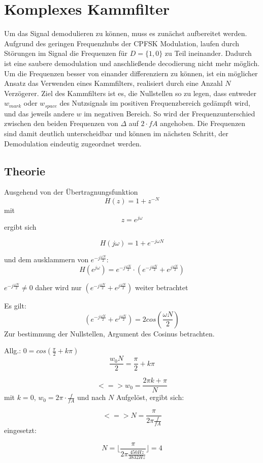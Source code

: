 \documentclass{article}
\begin{document}
\section{Komplexes Kammfilter}\label{sec:comb}
Um das Signal demodulieren zu können, muss es zunächst aufbereitet werden. 
Aufgrund des geringen Frequenzhubs der CPFSK Modulation, laufen durch Störungen im Signal die Frequenzen 
für $D = \{1, 0\}$ zu Teil ineinander. Dadurch ist eine saubere demodulation und anschließende decodierung
nicht mehr möglich. Um die Frequenzen besser von einander differenziern zu können, ist ein möglicher Ansatz 
das Verwenden eines Kammfilters, realisiert durch eine Anzahl $N$ Verzögerer.
Ziel des Kammfilters ist es, die Nullstellen so zu legen, dass entweder $w_{mark}$ oder $w_{space}$ des Nutzsignals im positiven Frequenzbereich
gedämpft wird, und das jeweils andere $w$ im negativen Bereich. So wird der Frequenzunterschied zwischen den beiden Frequenzen von $\varDelta$ auf $2\cdot fA$ angehoben.
Die Frequenzen sind damit deutlich unterscheidbar und können im nächsten Schritt, der Demodulation eindeutig zugeordnet werden. 

\subsection{Theorie}


Ausgehend von der Übertragnungsfunktion 
$$H(z) = 1 + z^{-N}$$ 
mit 
$$ z = e^{j\omega} $$
ergibt sich

$$H(j\omega) = 1 + e^{-j\omega N}$$

und dem ausklammern von $ e^{-j \frac{\omega N}{2}}$:
$$
H(e^{j\omega}) = e^{-j \frac{\omega N}{2}} \cdot (e^{-j \frac{\omega N}{2}} + e^{j \frac{\omega N}{2}})
$$

$e^{-j \frac{\omega N}{2}} \neq 0$ daher wird nur $(e^{-j \frac{\omega N}{2}} + e^{j \frac{\omega N}{2}})$ weiter betrachtet

Es gilt:
$$
(e^{-j \frac{\omega N}{2}} + e^{j \frac{\omega N}{2}}) = 2  cos(\frac{\omega N}{2})
$$
Zur bestimmung der Nullstellen, Argument des Cosinus betrachten.

Allg.: $0 = cos(\frac{\pi}{2} + k\pi)$
$$
\frac{w_0 N}{2} = \frac{\pi}{2} + k\pi
$$

$$
<=> w_0 = \frac{2\pi k + \pi}{N}
$$
mit $k = 0$, $w_0 = 2\pi \cdot \frac{f}{fA}$ und nach $N$ Aufgelöst, ergibt sich:

$$
<=> N = \frac{\pi}{2\pi \frac{f}{fA}}
$$
eingesetzt:

$$
N = \lfloor \frac{\pi}{2\pi \frac{450Hz}{3832Hz}}\rfloor = 4
$$
\end{document}
